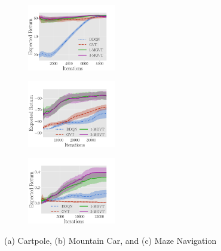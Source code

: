 \documentclass{article}
\begin{document}
\begin{figure}[t]
  \begin{subfigure}[b]{0.32\textwidth}
    \includegraphics[trim=0.0cm 0cm 1.8cm 1.3cm,clip=true,height=2.9cm]{images/cartpole/lrev.pdf}
    \caption{}\label{f:cartpole}
  \end{subfigure}
    \begin{subfigure}[b]{0.32\textwidth}
    \includegraphics[trim=0.0cm 0cm 1.6cm 1.3cm,clip=true,height=2.9cm]{images/mountaincar/lrev.pdf}
    \caption{}\label{f:mountaincar}
  \end{subfigure}
    \begin{subfigure}[b]{0.32\textwidth}
    \includegraphics[trim=0.0cm 0cm 1.6cm 1.3cm,clip=true,height=2.9cm]{images/maze/lrev_main.pdf}
    \caption{}\label{f:maze_results}
  \end{subfigure}
  \caption{(a) Cartpole, (b) Mountain Car, and (c) Maze Navigation}
  \label{fig:ccmazeplots}
\end{figure}
\end{document}
